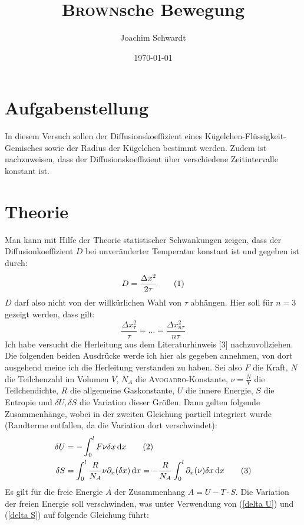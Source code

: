 \documentclass[a4paper,12pt]{article}
\newcommand\numberthis{\addtocounter{equation}{1}\tag{\theequation}}
\newcommand{\intx}{}
\begin{document}
\title{\textsc{Brown}sche Bewegung}
\author{Joachim Schwardt}
\date{\today}
\maketitle

\section{Aufgabenstellung}
In diesem Versuch sollen der Diffusionskoeffizient eines Kügelchen-Flüssigkeit-Gemisches sowie der Radius der Kügelchen bestimmt werden. Zudem ist nachzuweisen, dass der Diffusionskoeffizient über verschiedene Zeitintervalle konstant ist. 
\section{Theorie}
Man kann mit Hilfe der Theorie statistischer Schwankungen zeigen, dass der Diffusionkoeffizient $D$ bei unveränderter Temperatur konstant ist und gegeben ist durch:
\begin{align*}
D=\frac{\Delta x^2}{2\tau} \numberthis\label{D von tau}
\end{align*}
$D$ darf also nicht von der willkürlichen Wahl von $\tau$ abhängen. Hier soll für $n=3$ gezeigt werden, dass gilt:
$$\frac{\Delta x_\tau^2}{\tau}=\dots =\frac{\Delta x_{n\tau}^2}{n\tau}$$
Ich habe versucht die Herleitung aus dem Literaturhinweis [3] nachzuvollziehen. Die folgenden beiden Ausdrücke werde ich hier als gegeben annehmen, von dort ausgehend meine ich die Herleitung verstanden zu haben. Sei also $F$ die Kraft, $N$ die Teilchenzahl im Volumen $V$, $N_A$ die \textsc{Avogadro}-Konstante, $\nu=\frac{N}{V}$ die Teilchendichte, $R$ die allgemeine Gaskonstante, $U$ die innere Energie, $S$ die Entropie und $\delta U, \delta S$ die Variation dieser Größen. Dann gelten folgende Zusammenhänge, wobei in der zweiten Gleichung partiell integriert wurde (Randterme entfallen, da die Variation dort verschwindet):
\begin{align*}
\delta U&=-\intx\int_{0}^{l}F\nu \delta x\,\mathrm{d}x \numberthis\label{delta U} \\
\delta S&=\intx\int_{0}^{l}\frac{R}{N_A}\nu\partial_x(\delta x)\,\mathrm{d}x=-\frac{R}{N_A}\intx\int_{0}^{l}\partial_x(\nu)\delta x\,\mathrm{d}x \numberthis\label{delta S}
\end{align*}
Es gilt für die freie Energie $A$ der Zusammenhang $A=U-T\cdot S$. Die Variation der freien Energie soll verschwinden, was unter Verwendung von (\ref{delta U}) und (\ref{delta S}) auf folgende Gleichung führt:
\end{document}
